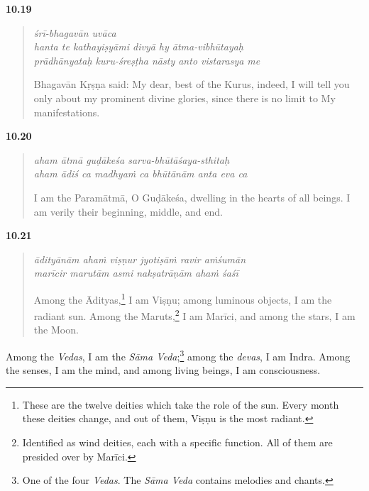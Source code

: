 \par\noindent\textbf{10.19}\par
\begin{verse}
\textit{śrī-bhagavān uvāca} \\
\textit{hanta te kathayiṣyāmi divyā hy ātma-vibhūtayaḥ} \\
\textit{prādhānyataḥ kuru-śreṣṭha nāsty anto vistarasya me}

\noindent Bhagavān Kṛṣṇa said: My dear, best of the Kurus, indeed, I will tell you only about my prominent divine glories, since there is no limit to My manifestations.
\end{verse}
\par



\par\noindent\textbf{10.20}\par
\begin{verse}
\textit{aham ātmā guḍākeśa sarva-bhūtāśaya-sthitaḥ} \\
\textit{aham ādiś ca madhyaṁ ca bhūtānām anta eva ca}

\noindent I am the Paramātmā, O Guḍākeśa, dwelling in the hearts of all beings. I am verily their beginning, middle, and end.
\end{verse}
\par



\par\noindent\textbf{10.21}\par
\begin{verse}
\textit{ādityānām ahaṁ viṣṇur jyotiṣāṁ ravir aṁśumān} \\
\textit{marīcir marutām asmi nakṣatrāṇām ahaṁ śaśī}

\noindent Among the Ādityas,\footnote{These are the twelve deities which take the role of the sun. Every month these deities change, and out of them, Viṣṇu is the most radiant.} I am Viṣṇu; among luminous objects, I am the radiant sun. Among the Maruts,\footnote{Identified as wind deities, each with a specific function. All of them are presided over by Marīci.} I am Marīci, and among the stars, I am the Moon.
\end{verse}
\par


{Among the \textit{Vedas}, I am the \textit{Sāma Veda};\footnote{One of the four \textit{Vedas}. The \textit{Sāma Veda} contains melodies and chants.} among the \textit{devas}, I am Indra. Among the senses, I am the mind, and among living beings, I am consciousness.}


